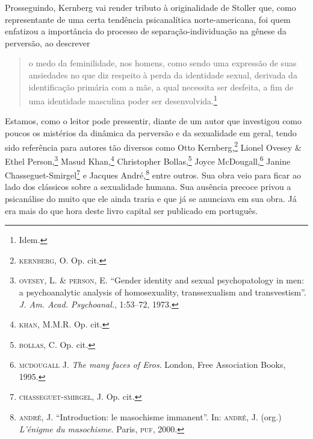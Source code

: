 Prosseguindo, Kernberg vai render tributo à originalidade de Stoller
que, como representante de uma certa tendência psicanalítica
norte-americana, foi quem enfatizou a importância do processo de
separação-individuação na gênese da perversão, ao descrever

\begin{quote}
o medo da feminilidade, nos homens, como sendo uma expressão de suas
ansiedades no que diz respeito à perda da identidade sexual, derivada da
identificação primária com a mãe, a qual necessita ser desfeita, a fim
de uma identidade masculina poder ser desenvolvida.\footnote{Idem\emph{.}}
\end{quote}

Estamos, como o leitor pode pressentir, diante de um autor que
investigou como poucos os mistérios da dinâmica da perversão e da
sexualidade em geral, tendo sido referência para autores tão diversos
como Otto Kernberg,\footnote{\textsc{kernberg}, O. Op. cit.} Lionel
Ovesey \& Ethel Person,\footnote{\textsc{ovesey}, L. \& \textsc{person},
  E. ``Gender identity and sexual psychopatology in men: a
  psychoanalytic analysis of homosexuality, transsexualism and
  transvestism''. \emph{J. Am. Acad. Psychoanal.}, 1:53--72, 1973.}
Masud Khan,\footnote{\textsc{khan}, M.M.R. Op. cit.} Christopher
Bollas,\footnote{\textsc{bollas}, C. Op. cit\emph{.}} Joyce
McDougall,\footnote{\textsc{mcdougall} J. \emph{The many faces of Eros}.
  London, Free Association Books, 1995.} Janine
Chasseguet-Smirgel\footnote{\textsc{chasseguet-smirgel}, J. Op.
  cit\emph{.}} e Jacques André,\footnote{\textsc{andré}, J.
  ``Introduction: le masochisme immanent''. In: \textsc{andré}, J.
  (org.) \emph{L'énigme du masochisme}. Paris, \textsc{puf}, 2000.}
entre outros. Sua obra veio para ficar ao lado dos clássicos sobre a
sexualidade humana. Sua ausência precoce privou a psicanálise do muito
que ele ainda traria e que já se anunciava em sua obra. Já era mais do
que hora deste livro capital ser publicado em português.
